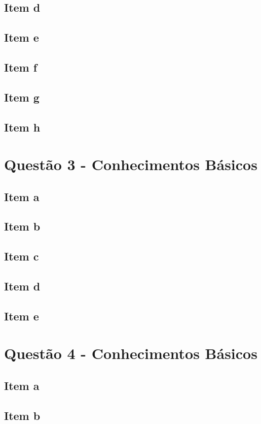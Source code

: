 \documentclass[a4paper, 12pt]{article}
\begin{document}
		\subsection{Item d}	
		\subsection{Item e}	
		\subsection{Item f}	
		\subsection{Item g}	
		\subsection{Item h}	
	\section{Quest\~{a}o 3 - Conhecimentos Básicos}
		\subsection{Item a}	
		\subsection{Item b}	
		\subsection{Item c}	
		\subsection{Item d}	
		\subsection{Item e}	
	\section{Quest\~{a}o 4 - Conhecimentos Básicos}
		\subsection{Item a}	
		\subsection{Item b}	
\end{document}

